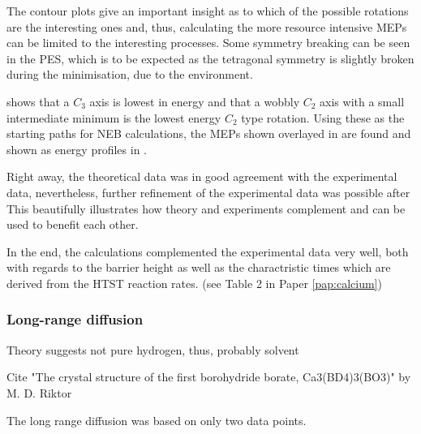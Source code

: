The contour plots give an important insight as to which of the possible rotations are the interesting ones and, thus, calculating the more resource intensive MEPs can be limited to the interesting processes.
Some symmetry breaking can be seen in the PES, which is to be expected as the tetragonal symmetry is slightly broken during the minimisation, due to the environment.

 shows that a $C_3$ axis is lowest in energy and that a wobbly $C_2$ axis with a small intermediate minimum is the lowest energy $C_2$ type rotation.
Using these as the starting paths for NEB calculations, the MEPs shown overlayed in  are found and shown as energy profiles in .

Right away, the theoretical data was in good agreement with the experimental data, nevertheless, further refinement of the experimental data was possible after \expand
This beautifully illustrates how theory and experiments complement and can be used to benefit each other.

In the end, the calculations complemented the experimental data very well, both with regards to the barrier height as well as the charactristic times which are derived from the HTST reaction rates. (see Table 2 in Paper \ref{pap:calcium})

\subsubsection{Long-range diffusion \pending}

\bit
\item Theory suggests not pure hydrogen, thus, probably solvent
\item Cite "The crystal structure of the first borohydride borate, Ca3(BD4)3(BO3)" by M. D. Riktor
\eit

The long range diffusion was based on only two data points.

\incomplete

